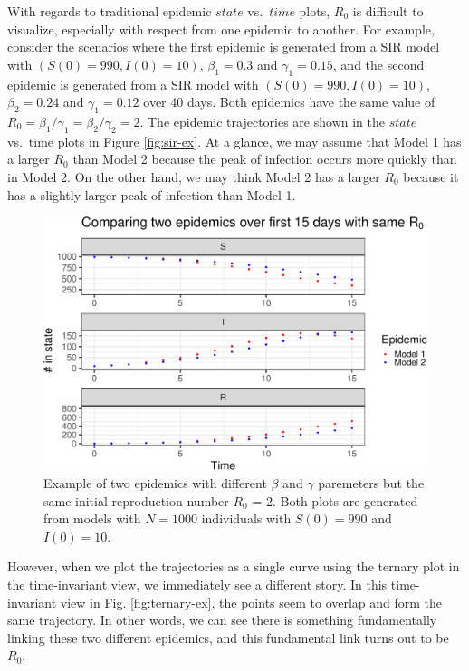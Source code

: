 \documentclass[
  shortnames]{jss}
\begin{document}
With regards to traditional epidemic \(state\) vs.~\(time\) plots,
\(R_0\) is difficult to visualize, especially with respect from one
epidemic to another. For example, consider the scenarios where the first
epidemic is generated from a SIR model with \((S(0) = 990, I(0) = 10)\),
\(\beta_1 = 0.3\) and \(\gamma_1 = 0.15\), and the second epidemic is
generated from a SIR model with \((S(0) = 990, I(0) = 10)\),
\(\beta_2 = 0.24\) and \(\gamma_1 = 0.12\) over 40 days. Both epidemics
have the same value of
\(R_0 = \beta_1/ \gamma_1 = \beta_2 / \gamma_2 = 2\). The epidemic
trajectories are shown in the \(state\) vs.~time plots in Figure
\ref{fig:sir-ex}. At a glance, we may assume that Model 1 has a larger
\(R_0\) than Model 2 because the peak of infection occurs more quickly
than in Model 2. On the other hand, we may think Model 2 has a larger
\(R_0\) because it has a slightly larger peak of infection than Model 1.

\begin{CodeChunk}
\begin{figure}[H]

{\centering \includegraphics{Figs/unnamed-chunk-2-1} 

}

\caption{\label{fig:different-scales-standard}Example of two epidemics with different $\beta$ and $\gamma$ paremeters but the same initial reproduction number $R_0$ = 2.  Both plots are generated from models with $N= 1000$ individuals with $S(0) = 990$ and $I(0) = 10$.}\label{fig:unnamed-chunk-2}
\end{figure}
\end{CodeChunk}

However, when we plot the trajectories as a single curve using the
ternary plot in the time-invariant view, we immediately see a different
story. In this time-invariant view in Fig. \ref{fig:ternary-ex}, the
points seem to overlap and form the same trajectory. In other words, we
can see there is something fundamentally linking these two different
epidemics, and this fundamental link turns out to be \(R_0\).
\end{document}
